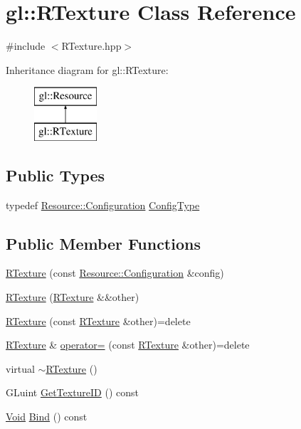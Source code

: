 \hypertarget{classgl_1_1_r_texture}{\section{gl\-:\-:R\-Texture Class Reference}
\label{classgl_1_1_r_texture}
}


{\ttfamily \#include $<$R\-Texture.\-hpp$>$}

Inheritance diagram for gl\-:\-:R\-Texture\-:\begin{figure}[H]
\begin{center}
\leavevmode
\includegraphics[height=2.000000cm]{classgl_1_1_r_texture}
\end{center}
\end{figure}
\subsection*{Public Types}
\begin{DoxyCompactItemize}
\item 
typedef \hyperlink{classgl_1_1_resource_1_1_configuration}{Resource\-::\-Configuration} \hyperlink{classgl_1_1_r_texture_af5e0de4fdd4b9bd003f8979a07324f0b}{Config\-Type}
\end{DoxyCompactItemize}
\subsection*{Public Member Functions}
\begin{DoxyCompactItemize}
\item 
\hyperlink{classgl_1_1_r_texture_af684b7ee8b937f87938fc3bd211c8345}{R\-Texture} (const \hyperlink{classgl_1_1_resource_1_1_configuration}{Resource\-::\-Configuration} \&config)
\item 
\hyperlink{classgl_1_1_r_texture_a3e1fcfd479e042799893e50b20c2952e}{R\-Texture} (\hyperlink{classgl_1_1_r_texture}{R\-Texture} \&\&other)
\item 
\hyperlink{classgl_1_1_r_texture_a234993b3dfb21867ef249647e233a602}{R\-Texture} (const \hyperlink{classgl_1_1_r_texture}{R\-Texture} \&other)=delete
\item 
\hyperlink{classgl_1_1_r_texture}{R\-Texture} \& \hyperlink{classgl_1_1_r_texture_a6eae2f7e17ebd821d0d3d3b9b2f665f3}{operator=} (const \hyperlink{classgl_1_1_r_texture}{R\-Texture} \&other)=delete
\item 
virtual \hyperlink{classgl_1_1_r_texture_a392daeb25c1bc9fe5d61b8efab97ec42}{$\sim$\-R\-Texture} ()
\item 
G\-Luint \hyperlink{classgl_1_1_r_texture_affea3581b93032c28456eb7a7fe9ffd0}{Get\-Texture\-I\-D} () const 
\item 
\hyperlink{_basic_types_8hpp_afdf0f22c576e6ee1b982f64b839c4bea}{Void} \hyperlink{classgl_1_1_r_texture_a62e2b26cad95a159430c3f61998ac572}{Bind} () const 
\end{DoxyCompactItemize}
